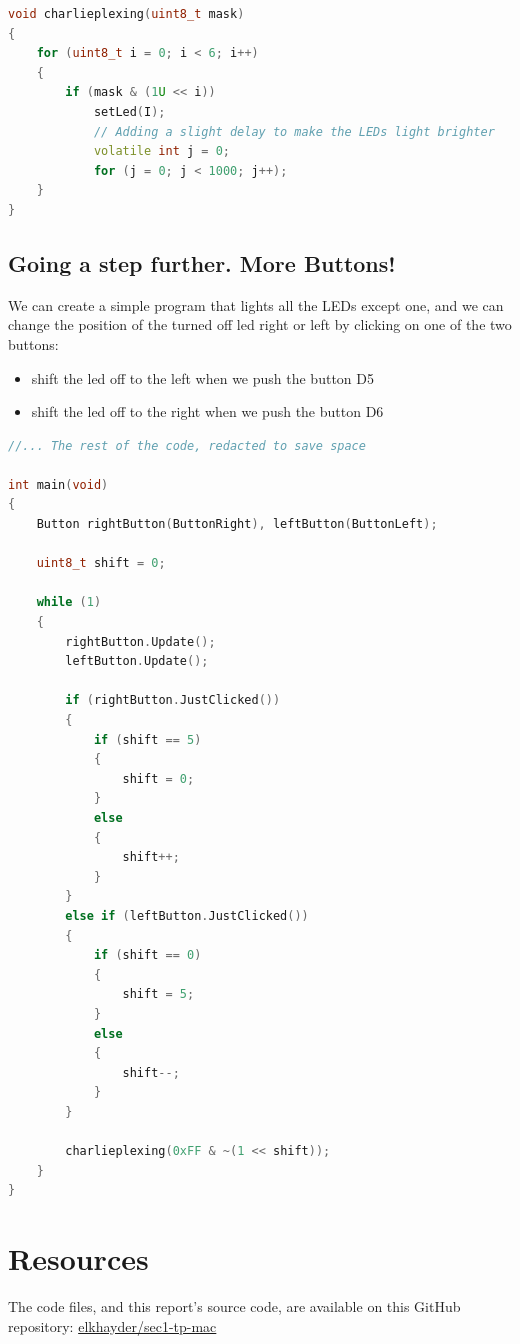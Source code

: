 \documentclass{article}
\begin{document}
\begin{lstlisting}[language=C++, caption={Charlieplexing with a mask}]
void charlieplexing(uint8_t mask)
{
    for (uint8_t i = 0; i < 6; i++)
    {
        if (mask & (1U << i))
            setLed(I);
            // Adding a slight delay to make the LEDs light brighter
            volatile int j = 0;
            for (j = 0; j < 1000; j++);
    }
}
\end{lstlisting}

\subsection{Going a step further. More Buttons!}

We can create a simple program that lights all the LEDs except one, and we can change the position of the turned off led right or left by clicking on one of the two buttons:
\begin{itemize}
    \item shift the led off to the left when we push the button D5
    \item shift the led off to the right when we push the button D6
\end{itemize}

\begin{lstlisting}[language=C++, caption={The LED game}]
//... The rest of the code, redacted to save space

int main(void)
{
    Button rightButton(ButtonRight), leftButton(ButtonLeft);

    uint8_t shift = 0;

    while (1)
    {
        rightButton.Update();
        leftButton.Update();

        if (rightButton.JustClicked())
        {
            if (shift == 5)
            {
                shift = 0;
            }
            else
            {
                shift++;
            }
        }
        else if (leftButton.JustClicked())
        {
            if (shift == 0)
            {
                shift = 5;
            }
            else
            {
                shift--;
            }
        }

        charlieplexing(0xFF & ~(1 << shift));
    }
}
\end{lstlisting}

\section*{Resources}
The code files, and this report's source code, are available on this GitHub repository: \href{https://github.com/elkhayder/sec1-tp-mac}{elkhayder/sec1-tp-mac} 
\end{document}
